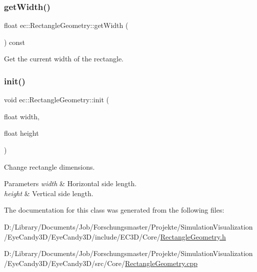 \mbox{\label{classec_1_1_rectangle_geometry_a1f75cd7d531e23fe3ccaff67178e0a08}} 
\subsubsection{\texorpdfstring{get\+Width()}{getWidth()}}
{\footnotesize\ttfamily float ec\+::\+Rectangle\+Geometry\+::get\+Width (\begin{DoxyParamCaption}{ }\end{DoxyParamCaption}) const}



Get the current width of the rectangle. 

\mbox{\label{classec_1_1_rectangle_geometry_ac6dd804a2fa2b253b71408dae5a08265}} 
\subsubsection{\texorpdfstring{init()}{init()}}
{\footnotesize\ttfamily void ec\+::\+Rectangle\+Geometry\+::init (\begin{DoxyParamCaption}\item[{float}]{width,  }\item[{float}]{height }\end{DoxyParamCaption})}



Change rectangle dimensions. 


\begin{DoxyParams}{Parameters}
{\em width} & Horizontal side length. \\
\hline
{\em height} & Vertical side length. \\
\hline
\end{DoxyParams}


The documentation for this class was generated from the following files\+:\begin{DoxyCompactItemize}
\item 
D\+:/\+Library/\+Documents/\+Job/\+Forschungsmaster/\+Projekte/\+Simulation\+Visualization/\+Eye\+Candy3\+D/\+Eye\+Candy3\+D/include/\+E\+C3\+D/\+Core/\mbox{\hyperlink{_rectangle_geometry_8h}{Rectangle\+Geometry.\+h}}\item 
D\+:/\+Library/\+Documents/\+Job/\+Forschungsmaster/\+Projekte/\+Simulation\+Visualization/\+Eye\+Candy3\+D/\+Eye\+Candy3\+D/src/\+Core/\mbox{\hyperlink{_rectangle_geometry_8cpp}{Rectangle\+Geometry.\+cpp}}\end{DoxyCompactItemize}
